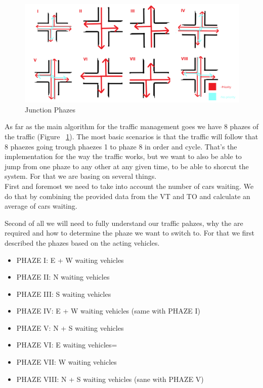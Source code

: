 \documentclass[17pt]{report}
\begin{document}
\begin{figure}[h!]
    \includegraphics[width=\textwidth]{Sketches/AvailableJunctionPhazes.png}
    \caption{Junction Phazes}
    \label{fig:Junction_Phazes}
\end{figure}

As far as the main algorithm for the traffic management goes we have 8 phazes of
the traffic (Figure ~\ref{fig:Junction_Phazes}). The most basic scenarios is that the 
traffic will follow that 8 phaezes going trough phaezes 1 to phaze 8 in order and cycle. That's
the implementation for the way the traffic works, but we want to also be
able to jump from one phaze to any other at any given time, to be able to shorcut
the system. For that we are basing on several things.\\

\indent \indent
First and foremost we need to take into 
account the number of cars waiting. We do that by combining the provided data from the 
VT and TO and calculate an average of cars waiting.

\indent \indent
Second of all we will need to fully understand our traffic pahzes, why the are required
and how to determine the phaze we want to switch to. For that we first described the 
phazes based on the acting vehicles.\\
\begin{itemize}
    \item PHAZE I: E + W waiting vehicles
    \item PHAZE II: N waiting vehicles
    \item PHAZE III: S waiting vehicles
    \item PHAZE IV: E + W waiting vehicles (same with PHAZE I)
    \item PHAZE V: N + S waiting vehicles
    \item PHAZE VI: E waiting vehicles=
    \item PHAZE VII: W waiting vehicles
    \item PHAZE VIII: N + S waiting vehicles (sane with PHAZE V)
\end{itemize}
\end{document}
